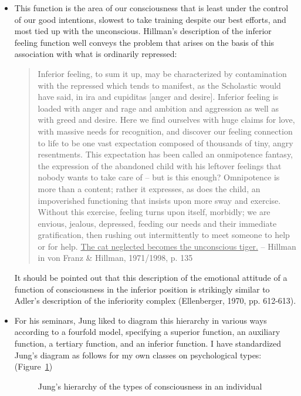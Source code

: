\begin{itemize}
\item This function is the area of our consciousness that is least under the
control of our good intentions, slowest to take training despite our best
efforts, and most tied up with the unconscious. Hillman's description of the
inferior feeling function well conveys the problem that arises on the basis of
this association with what is ordinarily repressed:

\begin{quote}

Inferior feeling, to sum it up, may be characterized by contamination with the
repressed which tends to manifest, as the Scholastic would have said, in ira
and cupiditas [anger and desire]. Inferior feeling is loaded with anger and
rage and ambition and aggression as well as with greed and desire. Here we find
ourselves with huge claims for love, with massive needs for recognition, and
discover our feeling connection to life to be one vast expectation composed of
thousands of tiny, angry resentments. This expectation has been called an
onmipotence fantasy, the expression of the abandoned child with his leftover
feelings that nobody wants to take care of -- but is this enough? Omnipotence
is more than a content; rather it expresses, as does the child, an impoverished
functioning that insists upon more sway and exercise. Without this exercise,
feeling turns upon itself, morbidly; we are envious, jealous, depressed,
feeding our needs and their immediate gratification, then rushing out
intermittently to meet someone to help or for help. \ul{The cat neglected
becomes the unconscious tiger.} \flushright -- Hillman in von Franz \& Hillman,
1971/1998, p. 135

\end{quote}

It should be pointed out that this description of the emotional attitude of a
function of consciousness in the inferior position is strikingly similar to
Adler's description of the inferiority complex (Ellenberger, 1970, pp.
612-613).

\item For his seminars, Jung liked to diagram this hierarchy in various ways
according to a fourfold model, specifying a superior function, an auxiliary
function, a tertiary function, and an inferior function. I have standardized
Jung's diagram as follows for my own classes on psychological types:
(Figure~\ref{fig:beebe-figure-31})

\begin{figure}[h!]
  \centering
\caption{Jung's hierarchy of the types of consciousness in an individual}
\label{fig:beebe-figure-31}
\end{figure}


\end{itemize}
